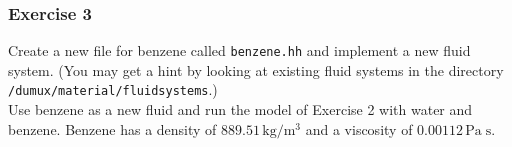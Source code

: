\subsubsection{Exercise 3}

Create a new file for benzene called \texttt{benzene.hh} and implement
a new fluid system. (You may get a hint by looking at existing fluid 
systems in the directory \verb+/dumux/material/fluidsystems+.) \\
Use benzene as a new fluid and run the model of Exercise 2 with water
and benzene. Benzene has a density of $889.51 \, \text{kg} / \text{m}^3$
and a viscosity of $0.00112 \, \text{Pa} \; \text{s}$. 

\clearpage \newpage
